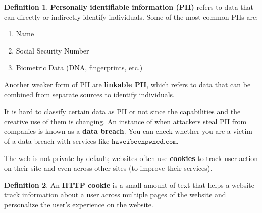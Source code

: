 \documentclass[a4paper, 12pt]{report}
\theoremstyle{remark}
\theoremstyle{definition}
\newtheorem{definition}{Definition}[section]
\begin{document}
\begin{definition}
\textbf{Personally identifiable information (PII)} refers to data that can directly or indirectly identify individuals. Some of the most common PIIs are: 
\begin{enumerate}
    \item Name 
    \item Social Security Number
    \item Biometric Data (DNA, fingerprints, etc.)
\end{enumerate}
Another weaker form of PII are \textbf{linkable PII}, which refers to data that can be combined from separate sources to identify individuals. 
\end{definition}

It is hard to classify certain data as PII or not since the capabilities and the creative use of them is changing. An instance of when attackers steal PII from companies is known as a \textbf{data breach}. You can check whether you are a victim of a data breach with services like $\texttt{haveibeenpwned.com}$. 

The web is not private by default; websites often use \textbf{cookies} to track user action on their site and even across other sites (to improve their services).

\begin{definition}
An \textbf{HTTP cookie} is a small amount of text that helps a website track information about a user across multiple pages of the website and personalize the user's experience on the website. 
\end{definition}
\end{document}

